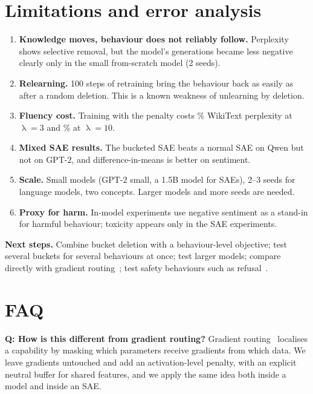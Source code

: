 \documentclass[11pt,a4paper]{article}
\theoremstyle{definition}
\begin{document}
\section{Limitations and error analysis}
\label{sec:limits}
\begin{enumerate}
  \item \textbf{Knowledge moves, behaviour does not reliably follow.} Perplexity shows selective
  removal, but the model's generations became less negative clearly only in the small
  from-scratch model (2 seeds).
  \item \textbf{Relearning.} 100 steps of retraining bring the behaviour back as easily as after a
  random deletion. This is a known weakness of unlearning by deletion.
  \item \textbf{Fluency cost.} Training with the penalty costs \gtWikiCostPct\% WikiText perplexity at
  $\uplambda=3$ and \ghWikiCostPct\% at $\uplambda=10$.
  \item \textbf{Mixed SAE results.} The bucketed SAE beats a normal SAE on Qwen but not on GPT-2, and
  difference-in-means is better on sentiment.
  \item \textbf{Scale.} Small models (GPT-2 small, a 1.5B model for SAEs), 2--3 seeds for language
  models, two concepts. Larger models and more seeds are needed.
  \item \textbf{Proxy for harm.} In-model experiments use negative sentiment as a stand-in for harmful
  behaviour; toxicity appears only in the SAE experiments.
\end{enumerate}

\textbf{Next steps.} Combine bucket deletion with a behaviour-level objective; test several
buckets for several behaviours at once; test larger models; compare directly with gradient
routing~\cite{cloud2024gradient}; test safety behaviours such as refusal~\cite{arditi2024refusal}.

\section{FAQ}
\label{sec:qa}

\textbf{Q: How is this different from gradient routing?} Gradient routing~\cite{cloud2024gradient}
localises a capability by masking which parameters receive gradients from which data. We leave
gradients untouched and add an activation-level penalty, with an explicit neutral buffer for
shared features, and we apply the same idea both inside a model and inside an SAE.
\end{document}
